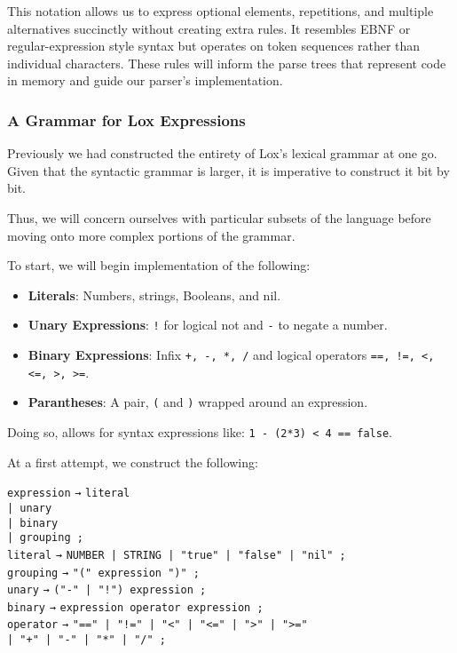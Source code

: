 \documentclass[12pt,a4paper]{article}
\newcommand{\newpar} {
  \vspace{1em}
  \noindent
}
\begin{document}
\newpar
This notation allows us to express optional elements, repetitions, and multiple alternatives succinctly without creating extra rules. It resembles EBNF or regular-expression style syntax but operates on token sequences rather than individual characters. These rules will inform the parse trees that represent code in memory and guide our parser’s implementation.

\subsubsection{A Grammar for Lox Expressions}

Previously we had constructed the entirety of Lox's lexical grammar at one go. Given that the syntactic grammar is larger, it is
imperative to construct it bit by bit.

\newpar
Thus, we will concern ourselves with particular subsets of the language before moving onto more complex portions of the grammar.

\newpar
To start, we will begin implementation of the following:
\begin{itemize}

	\item \textbf{Literals}: Numbers, strings, Booleans, and nil.

	\item \textbf{Unary Expressions}: \texttt{!} for logical not and \texttt{-} to negate a number.

	\item \textbf{Binary Expressions}: Infix \texttt{+, -, *, /} and logical operators \texttt{==, !=, <, <=, >, >=}.

	\item \textbf{Parantheses}: A pair, \texttt{(} and \texttt{)} wrapped around an expression.

\end{itemize}

\newpar
Doing so, allows for syntax expressions like: \texttt{1 - (2*3) < 4 == false}.

\newpar
At a first attempt, we construct the following:

\newpar
\begin{tabbing}
	\texttt{expression}  \quad \= \texttt{→} \= \texttt{literal} \\
	\>  \texttt{| unary} \\
	\>  \texttt{| binary} \\
	\>  \texttt{| grouping ;} \\[2mm]

	\texttt{literal} \> \texttt{→} \> \texttt{NUMBER | STRING | "true" | "false" | "nil" ;} \\
	\texttt{grouping} \> \texttt{→} \> \texttt{"(" expression ")" ;} \\
	\texttt{unary} \> \texttt{→} \> \texttt{("-" | "!") expression ;} \\
	\texttt{binary} \> \texttt{→} \> \texttt{expression operator expression ;} \\
	\texttt{operator} \> \texttt{→} \> \texttt{"==" | "!=" | "<" | "<=" | ">" | ">="} \\
	\> \texttt{| "+" | "-" | "*" | "/" ;}
\end{tabbing}
\end{document}
